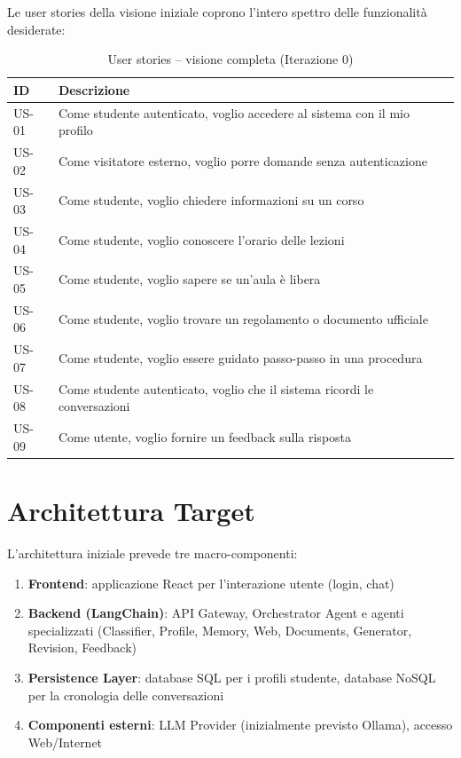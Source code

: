 \documentclass[a4paper,12pt]{report}
\begin{document}
Le user stories della visione iniziale coprono l'intero spettro delle funzionalità desiderate:

\begin{table}[H]
\centering
\begin{tabularx}{\textwidth}{l X}
\toprule
\textbf{ID} & \textbf{Descrizione} \\
\midrule
US-01 & Come studente autenticato, voglio accedere al sistema con il mio profilo \\
US-02 & Come visitatore esterno, voglio porre domande senza autenticazione \\
US-03 & Come studente, voglio chiedere informazioni su un corso \\
US-04 & Come studente, voglio conoscere l'orario delle lezioni \\
US-05 & Come studente, voglio sapere se un'aula è libera \\
US-06 & Come studente, voglio trovare un regolamento o documento ufficiale \\
US-07 & Come studente, voglio essere guidato passo-passo in una procedura \\
US-08 & Come studente autenticato, voglio che il sistema ricordi le conversazioni \\
US-09 & Come utente, voglio fornire un feedback sulla risposta \\
\bottomrule
\end{tabularx}
\caption{User stories -- visione completa (Iterazione 0)}
\end{table}

\section{Architettura Target}

L'architettura iniziale prevede tre macro-componenti:

\begin{enumerate}
    \item \textbf{Frontend}: applicazione React per l'interazione utente (login, chat)
    \item \textbf{Backend (LangChain)}: API Gateway, Orchestrator Agent e agenti specializzati (Classifier, Profile, Memory, Web, Documents, Generator, Revision, Feedback)
    \item \textbf{Persistence Layer}: database SQL per i profili studente, database NoSQL per la cronologia delle conversazioni
    \item \textbf{Componenti esterni}: LLM Provider (inizialmente previsto Ollama), accesso Web/Internet
\end{enumerate}
\end{document}
